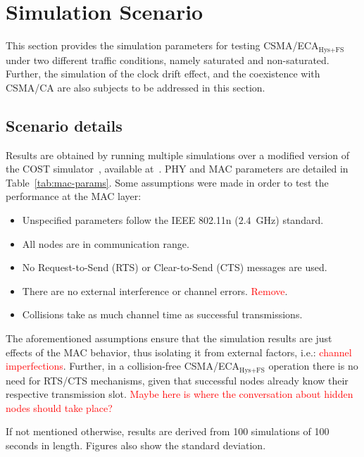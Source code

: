 \section{Simulation Scenario}\label{simulations}
This section provides the simulation parameters for testing CSMA/ECA$_{\text{Hys+FS}}$ under two different traffic conditions, namely saturated and non-saturated. Further, the simulation of the clock drift effect, and the coexistence with CSMA/CA are also subjects to be addressed in this section.

	\subsection{Scenario details}
	Results are obtained by running multiple simulations over a modified version of the COST simulator~\cite{COST}, available at~\cite{sim:parameters}. PHY and MAC parameters are detailed in Table~\ref{tab:mac-params}. Some assumptions were made in order to test the performance at the MAC layer:
	
	\begin{itemize}
		\item Unspecified parameters follow the IEEE 802.11n ($2.4$~GHz) standard.
		\item All nodes are in communication range.
		\item No Request-to-Send (RTS) or Clear-to-Send (CTS) messages are used.
		\item There are no external interference or channel errors. \textcolor{red}{Remove}.
		\item Collisions take as much channel time as successful transmissions.
	\end{itemize}
	
	The aforementioned assumptions ensure that the simulation results are just effects of the MAC behavior, thus isolating it from external factors, i.e.: \textcolor{red}{channel imperfections}. Further, in a collision-free CSMA/ECA$_{\text{Hys+FS}}$ operation there is no need for RTS/CTS mechanisms, given that successful nodes already know their respective transmission slot. \textcolor{red}{Maybe here is where the conversation about hidden nodes should take place?}
	
	If not mentioned otherwise, results are derived from 100 simulations of 100 seconds in length. Figures also show the standard deviation.
	
